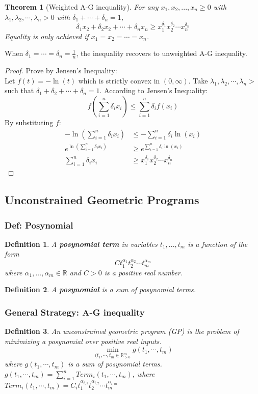 \documentclass[11pt,a4paper]{article}
\newtheorem{theorem}{Theorem}
\newtheorem{definition}{Definition}
\begin{document}
\begin{theorem}[Weighted A-G inequality]
    For any $x_1,x_2,...,x_n\geq 0$ with $\lambda_1,\lambda_2,\cdots,\lambda_n>0$ with $\delta_1+\cdots+\delta_n=1$, $$\delta_1x_2+\delta_2x_2+\cdots+\delta_nx_n\geq x_1^{\delta_1}x_2^{\delta_2}\cdots x_n^{\delta_n}$$
    Equality is only achieved if $x_1=x_2=\cdots=x_n$.
\end{theorem}
When $\delta_1=\cdots=\delta_n=\frac{1}{n}$, the inequality recovers to unweighted A-G inequality.
\begin{proof}Prove by Jensen's Inequality:\\
    Let $f(t)=-\ln(t)$ which is strictly convex in $(0,\infty)$. Take $\lambda_1,\lambda_2,\cdots,\lambda_n>$ such that $\delta_1+\delta_2+\cdots+\delta_n=1$. According to Jensen's Inequality: $$f(\sum_{i=1}^n\delta_i x_i)\leq \sum_{i=1}^n\delta_i f(x_i)$$
    By substituting $f$:
    \begin{equation}
        \begin{aligned}
            -\ln(\sum_{i=1}^n\delta_i x_i)&\leq -\sum_{i=1}^n\delta_i \ln(x_i)\\
            e^{\ln(\sum_{i=1}^n\delta_i x_i)}&\geq e^{\sum_{i=1}^n\delta_i \ln(x_i)}\\
            \sum_{i=1}^n\delta_i x_i&\geq x_1^{\delta_1}x_2^{\delta_2}\cdots x_n^{\delta_n}
        \end{aligned}
        \nonumber
    \end{equation}
\end{proof}

\subsection{Unconstrained Geometric Programs}
\subsubsection{Def: Posynomial}
\begin{definition}
    A \textbf{posynomial term} in variables $t_1,...,t_m$ is a function of the form $$Ct_1^{\alpha_1}t_2^{\alpha_2}\cdots t_m^{\alpha_m}$$ where $\alpha_1,...,\alpha_m\in \mathbb{R}$ and $C>0$ is a positive real number.
\end{definition}
\begin{definition}
    A \textbf{posynomial} is a sum of posynomial terms.
\end{definition}

\subsubsection{General Strategy: A-G inequality}
\begin{definition}
    An unconstrained geometric program (GP) is the problem of minimizing a posynomial over positive real inputs.
    $$\min_{(t_1,\cdots,t_m\in \mathbb{R}^m_{>0}}g(t_1,\cdots,t_m)$$
    where $g(t_1,\cdots,t_m)$ is a sum of posynomial terms. $g(t_1,\cdots,t_m)=\sum_{i=1}^n{Term}_i(t_1,\cdots,t_m)$, where ${Term}_i(t_1,\cdots,t_m)=C_i t_1^{\alpha_{i,1}}t_2^{\alpha_{i,2}}\cdots t_m^{\alpha_{i,m}}$
\end{definition}
\end{document}
